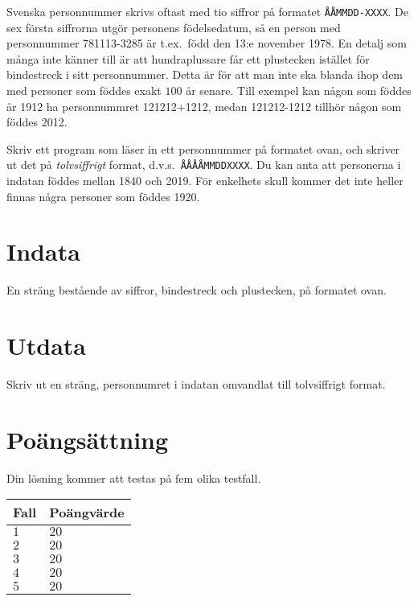 
Svenska personnummer skrivs oftast med tio siffror på formatet \texttt{ÅÅMMDD-XXXX}. De sex första siffrorna utgör personens födelsedatum, så en
person med personnummer 781113-3285 är t.ex.\ född den 13:e november 1978. En detalj som många
inte känner till är att hundraplussare får ett plustecken istället för bindestreck i sitt 
personnummer. Detta är för att man inte ska blanda ihop dem med personer som föddes exakt $100$
år senare. Till exempel kan någon som föddes år 1912 ha personnummret 121212+1212, medan 
121212-1212 tillhör någon som föddes 2012. 

Skriv ett program som läser in ett personnummer på formatet ovan,
och skriver ut det på \emph{tolvsiffrigt} format, d.v.s.\ \texttt{ÅÅÅÅMMDDXXXX}.
Du kan anta att personerna i indatan föddes mellan 1840 och 2019.
För enkelhets skull kommer det inte heller finnas några personer som föddes 1920. 


\section*{Indata}
En sträng bestående av siffror, bindestreck och plustecken, på formatet ovan.

\section*{Utdata}
Skriv ut en sträng, personnumret i indatan omvandlat till tolvsiffrigt format.

\section*{Poängsättning}
Din lösning kommer att testas på fem olika testfall.

\noindent
\begin{tabular}{| l | l |}
  \hline
  Fall & Poängvärde \\ \hline
  $1$    & $20$        \\ \hline 
  $2$    & $20$        \\ \hline 
  $3$    & $20$        \\ \hline 
  $4$    & $20$        \\ \hline
  $5$    & $20$        \\ \hline
\end{tabular}
